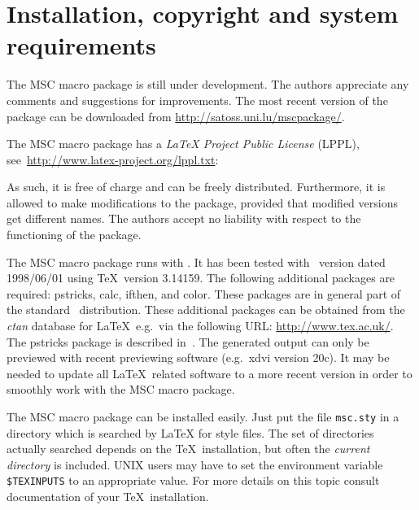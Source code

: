 \documentclass[12pt,a4paper]{article}
\newcommand{\acro}[1]{{#1}}
\newcommand{\MSC}{\acro{MSC}}
\newcommand{\mscpack}{\MSC{} macro package}
\begin{document}
\section{Installation, copyright and system requirements}
\label{install}

The \mscpack{} is still under development. The authors
appreciate any comments and suggestions for improvements. The most
recent version of the package can be downloaded from
\url{http://satoss.uni.lu/mscpackage/}.


The \mscpack{} has a \emph{LaTeX Project Public License}
(LPPL), see~\url{http://www.latex-project.org/lppl.txt}:
{\small

} As such, it is free of charge and can be freely
distributed. Furthermore, it is allowed to make modifications to the
package, provided that modified versions get different names.  The
authors accept no liability with respect to the functioning of the
package.

The \mscpack{} runs with \LaTeXe. It has been tested with \LaTeXe\
version dated 1998/06/01 using \TeX\ version 3.14159.  The following
additional packages are required: \textsf{pstricks}, \textsf{calc},
\textsf{ifthen}, and \textsf{color}.  These packages are in general
part of the standard \LaTeXe\ distribution. These additional packages
can be obtained from the {\em ctan} database for \LaTeX\, e.g.\ via
the following URL: \url{http://www.tex.ac.uk/}. The \textsf{pstricks}
package is described in~\cite[Chapter~4]{GSM97}.  The generated output
can only be previewed with recent previewing software (e.g.\ xdvi
version 20c).  It may be needed to update all \LaTeX\ related software
to a more recent version in order to smoothly work with the \mscpack.

The \mscpack{} can be installed easily. Just put the file
\verb+msc.sty+ in a directory which is searched by \LaTeX{} for style
files. The set of directories actually searched depends on the \TeX\
installation, but often the {\em current directory} is included. UNIX
users may have to set the environment variable \texttt{\$TEXINPUTS} to
an appropriate value.  For more details on this topic consult
documentation of your \TeX\ installation.

%
\end{document}
